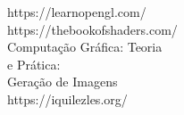 \documentclass[preview]{standalone}
\begin{document}
https://learnopengl.com/\\https://thebookofshaders.com/\\Computação Gráfica: Teoria\\e Prática:\\Geração de Imagens\\https://iquilezles.org/\\
\end{document}
